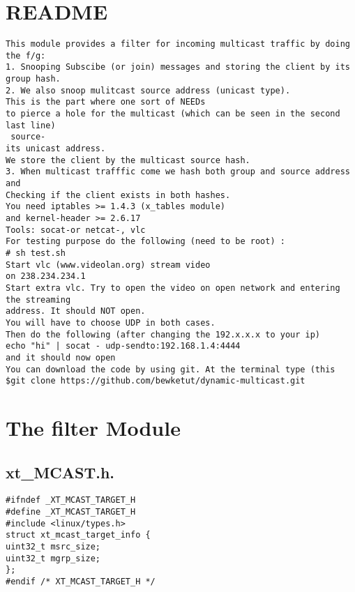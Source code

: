 \section{README}
\begin{verbatim}
This module provides a filter for incoming multicast traffic by doing the f/g:
1. Snooping Subscibe (or join) messages and storing the client by its group hash.
2. We also snoop mulitcast source address (unicast type). 
This is the part where one sort of NEEDs
to pierce a hole for the multicast (which can be seen in the second last line)
 source-
its unicast address.
We store the client by the multicast source hash.
3. When multicast trafffic come we hash both group and source address and
Checking if the client exists in both hashes.
You need iptables >= 1.4.3 (x_tables module)
and kernel-header >= 2.6.17
Tools: socat-or netcat-, vlc
For testing purpose do the following (need to be root) :
# sh test.sh
Start vlc (www.videolan.org) stream video
on 238.234.234.1
Start extra vlc. Try to open the video on open network and entering the streaming
address. It should NOT open.
You will have to choose UDP in both cases.
Then do the following (after changing the 192.x.x.x to your ip)
echo "hi" | socat - udp-sendto:192.168.1.4:4444
and it should now open
You can download the code by using git. At the terminal type (this
$git clone https://github.com/bewketut/dynamic-multicast.git
\end{verbatim}
\section{The filter Module}
\subsection{xt\_MCAST.h.}
\begin{verbatim}
#ifndef _XT_MCAST_TARGET_H
#define _XT_MCAST_TARGET_H
#include <linux/types.h>
struct xt_mcast_target_info {
uint32_t msrc_size;
uint32_t mgrp_size;
};
#endif /* XT_MCAST_TARGET_H */
\end{verbatim}
